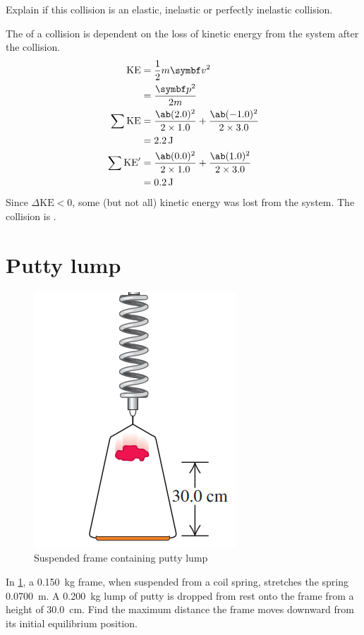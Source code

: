 \begin{problem}
  Explain if this collision is an elastic, inelastic or perfectly
  inelastic collision.
\end{problem}
The  of a collision is dependent on the loss of kinetic energy
from the system after the collision.
\begin{align*}
  \text{KE} &= \f{1}{2}m\mv{v}^2 \\
  &= \f{\mv{p}^2}{2m} \\
  \sum \text{KE} &= \f{\ab(2.0)^2}{2\times 1.0} +
  \f{\ab(-1.0)^2}{2\times 3.0} \\
  &= \qty{2.2}{\joule} \\
  \sum \text{KE}' &= \f{\ab(0.0)^2}{2\times 1.0} +
  \f{\ab(1.0)^2}{2\times 3.0} \\
  &= \qty{0.2}{\joule}
\end{align*}
Since \(\Delta\text{KE} < 0\), some (but not all) kinetic energy was
lost from the system. The collision is .

\section{Putty lump}
\begin{figure}
  \includegraphics[scale=0.5]{assets/puttylump.png}
  \caption{Suspended frame containing putty lump}
  \label{fig:puttylump}
\end{figure}

\begin{problem}
  In \cref{fig:puttylump}, a \qty{0.150}{\kg} frame, when suspended from a coil
  spring, stretches the spring \qty{0.0700}{\metre}. A \qty{0.200}{\kg} lump of
  putty is dropped from rest onto the frame from a height of \qty{30.0}{\cm}.
  Find the maximum distance the frame moves downward from its
  initial equilibrium position.
\end{problem}

